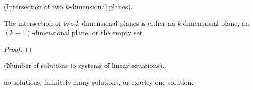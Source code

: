 \begin{lemma}
    (Intersection of two $k$-dimensional planes).
    
    The intersection of two $k$-dimensional planes is either an $k$-dimensional plane, an $(k - 1)$-dimensional plane, or the empty set.
\end{lemma}

\begin{proof}
    
\end{proof}

\begin{theorem}
    (Number of solutions to systems of linear equations). 
    
    no solutions, infinitely many solutions, or exactly one solution.
\end{theorem}


